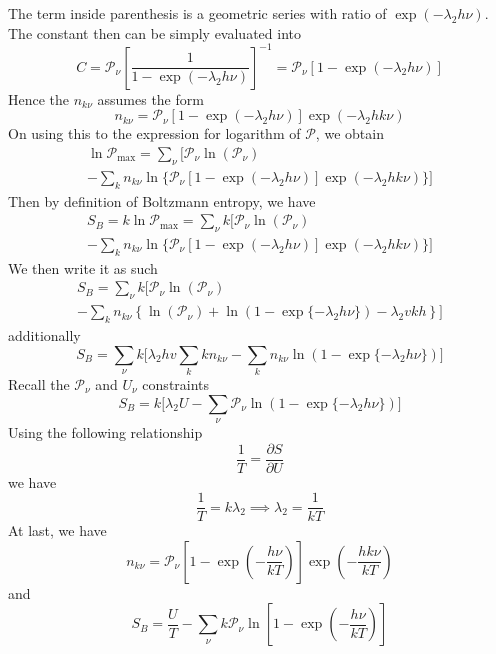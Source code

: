\documentclass[../../../Main.tex]{subfiles}
\begin{document}
The term inside parenthesis is a geometric series with ratio of $\exp(-\lambda_2h\nu)$. The constant then can be simply evaluated into 
\begin{equation*}
    C=\mathcal{P}_\nu\left[\frac{1}{1-\exp(-\lambda_2h\nu)}\right]^{-1} = \mathcal{P}_\nu\left[1-\exp(-\lambda_2h\nu)\right]
\end{equation*}
Hence the $n_{k\nu}$ assumes the form 
\begin{equation*}
    n_{k\nu}=\mathcal{P}_\nu\left[1-\exp(-\lambda_2h\nu)\right]\exp\left(-\lambda_2hk\nu\right)
\end{equation*}
On using this to the expression for logarithm of $\mathcal{P}$, we obtain
\begin{multline*}
    \ln \mathcal{P}_{\max}= \sum_\nu \bigg[ \mathcal{P}_\nu \ln \left(\mathcal{P}_\nu\right) \\
    - \sum_{k} n_{k\nu}\ln \{\mathcal{P}_\nu\left[1-\exp(-\lambda_2h\nu)\right]\exp\left(-\lambda_2hk\nu\right) \} \bigg]
\end{multline*}
Then by definition of Boltzmann entropy, we have
\begin{multline*}
    S_B=k  \ln \mathcal{P}_{\max}= \sum_\nu k  \bigg[ \mathcal{P}_\nu \ln \left(\mathcal{P}_\nu\right) \\
    - \sum_{k} n_{k\nu}\ln \{\mathcal{P}_\nu\left[1-\exp(-\lambda_2h\nu)\right]\exp\left(-\lambda_2hk\nu\right) \} \bigg]
\end{multline*}
We then write it as such 
\begin{multline*}
    S_B= \sum_\nu k  \bigg[ \mathcal{P}_\nu \ln \left(\mathcal{P}_\nu\right) \\
    - \sum_{k} n_{k\nu}\left\{\ln(\mathcal{P}_\nu)+\ln (1-\exp\{-\lambda_2h\nu\})-\lambda_2vkh\right\} \bigg]
\end{multline*}
additionally
\begin{equation*}
    S_B= \sum_\nu k  \bigg[\lambda_2hv\sum_{k}kn_{k\nu} - \sum_{k} n_{k\nu}\ln (1-\exp\{-\lambda_2h\nu\})\bigg]
\end{equation*}
Recall the $\mathcal{P}_\nu$ and $U_\nu$ constraints
\begin{equation*}
    S_B= k  \bigg[\lambda_2U- \sum_\nu\mathcal{P}_\nu \ln (1-\exp\{-\lambda_2h\nu\})\bigg]
\end{equation*}
Using the following relationship
\begin{equation*}
    \frac{1}{T}=\frac{\partial S}{\partial U}
\end{equation*}
we have
\begin{equation*}
    \frac{1}{T}=k \lambda_2\implies \lambda_2=\frac{1}{k T}
\end{equation*}
At last, we have 
\begin{equation*}
    n_{k\nu}=\mathcal{P}_\nu\left[1-\exp\left(-\frac{h\nu}{k T}\right)\right]\exp\left(-\frac{hk\nu}{k T}\right)
\end{equation*}
and
\begin{equation*}
    S_B= \frac{U}{T}- \sum_\nu k \mathcal{P}_\nu \ln \left[1-\exp\left(-\frac{h\nu}{k T}\right)\right]
\end{equation*}
\end{document}
